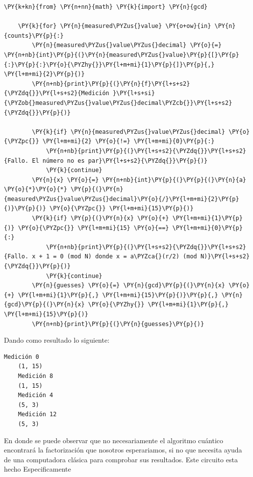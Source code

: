 \begin{tcolorbox}[breakable, size=fbox, boxrule=1pt, pad at break*=1mm,colback=cellbackground, colframe=cellborder]
    \begin{Verbatim}[commandchars=\\\{\}]
    \PY{k+kn}{from} \PY{n+nn}{math} \PY{k}{import} \PY{n}{gcd}
    
    \PY{k}{for} \PY{n}{measured\PYZus{}value} \PY{o+ow}{in} \PY{n}{counts}\PY{p}{:}
        \PY{n}{measured\PYZus{}value\PYZus{}decimal} \PY{o}{=} \PY{n+nb}{int}\PY{p}{(}\PY{n}{measured\PYZus{}value}\PY{p}{[}\PY{p}{:}\PY{p}{:}\PY{o}{\PYZhy{}}\PY{l+m+mi}{1}\PY{p}{]}\PY{p}{,} \PY{l+m+mi}{2}\PY{p}{)}
        \PY{n+nb}{print}\PY{p}{(}\PY{n}{f}\PY{l+s+s2}{\PYZdq{}}\PY{l+s+s2}{Medición }\PY{l+s+si}{\PYZob{}measured\PYZus{}value\PYZus{}decimal\PYZcb{}}\PY{l+s+s2}{\PYZdq{}}\PY{p}{)}
        
        \PY{k}{if} \PY{n}{measured\PYZus{}value\PYZus{}decimal} \PY{o}{\PYZpc{}} \PY{l+m+mi}{2} \PY{o}{!=} \PY{l+m+mi}{0}\PY{p}{:}
            \PY{n+nb}{print}\PY{p}{(}\PY{l+s+s2}{\PYZdq{}}\PY{l+s+s2}{Fallo. El número no es par}\PY{l+s+s2}{\PYZdq{}}\PY{p}{)}
            \PY{k}{continue}
        \PY{n}{x} \PY{o}{=} \PY{n+nb}{int}\PY{p}{(}\PY{p}{(}\PY{n}{a} \PY{o}{*}\PY{o}{*} \PY{p}{(}\PY{n}{measured\PYZus{}value\PYZus{}decimal}\PY{o}{/}\PY{l+m+mi}{2}\PY{p}{)}\PY{p}{)} \PY{o}{\PYZpc{}} \PY{l+m+mi}{15}\PY{p}{)}
        \PY{k}{if} \PY{p}{(}\PY{n}{x} \PY{o}{+} \PY{l+m+mi}{1}\PY{p}{)} \PY{o}{\PYZpc{}} \PY{l+m+mi}{15} \PY{o}{==} \PY{l+m+mi}{0}\PY{p}{:}
            \PY{n+nb}{print}\PY{p}{(}\PY{l+s+s2}{\PYZdq{}}\PY{l+s+s2}{Fallo. x + 1 = 0 (mod N) donde x = a\PYZca{}(r/2) (mod N)}\PY{l+s+s2}{\PYZdq{}}\PY{p}{)}
            \PY{k}{continue}
        \PY{n}{guesses} \PY{o}{=} \PY{n}{gcd}\PY{p}{(}\PY{n}{x} \PY{o}{+} \PY{l+m+mi}{1}\PY{p}{,} \PY{l+m+mi}{15}\PY{p}{)}\PY{p}{,} \PY{n}{gcd}\PY{p}{(}\PY{n}{x} \PY{o}{\PYZhy{}} \PY{l+m+mi}{1}\PY{p}{,} \PY{l+m+mi}{15}\PY{p}{)}
        \PY{n+nb}{print}\PY{p}{(}\PY{n}{guesses}\PY{p}{)}
    \end{Verbatim}
    \end{tcolorbox}
Dando como resultado lo siguiente:
        \begin{Verbatim}[commandchars=\\\{\}]
    Medición 0
    (1, 15)
    Medición 8
    (1, 15)
    Medición 4
    (5, 3)
    Medición 12
    (5, 3)
        \end{Verbatim}
En donde se puede observar que no necesariamente el algoritmo cuántico encontrará la factorización que nosotros esperariamos, si no que necesita ayuda de una computadora clásica para comprobar sus resultados. Este circuito esta hecho Especificamente
